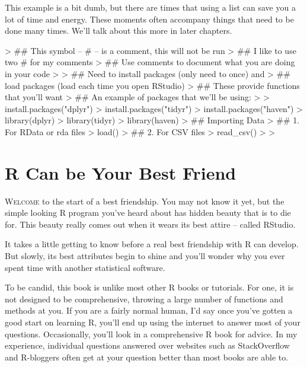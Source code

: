 \documentclass{book}
\begin{document}
This example is a bit dumb, but there are times that using a list can save you a lot of time and energy. These moments often accompany things that need to be done many times. We'll talk about this more in later chapters.




\begin{Schunk}
\begin{Sinput}
> ## This symbol -- # -- is a comment, this will not be run
> ## I like to use two # for my comments
> ## Use comments to document what you are doing in your code
> 
> ## Need to install packages (only need to once) and 
> ##   load packages (load each time you open RStudio)
> ## These provide functions that you'll want
> ## An example of packages that we'll be using:
> 
> install.packages("dplyr")
> install.packages("tidyr")
> install.packages("haven")
> library(dplyr)
> library(tidyr)
> library(haven)
> ## Importing Data
> ##   1. For RData or rda files
> load()
> ##   2. For CSV files
> read_csv()
> 
> 
\end{Sinput}
\end{Schunk}






\chapter{R Can be Your Best Friend}
\label{ch_intro}

\textsc{Welcome} to the start of a best friendship. You may not know it yet, but the simple looking R program you've heard about has hidden beauty that is to die for. This beauty really comes out when it wears its best attire -- called RStudio.

It takes a little getting to know before a real best friendship with R can develop. But slowly, its best attributes begin to shine and you'll wonder why you ever spent time with another statistical software.

To be candid, this book is unlike most other R books or tutorials. For one, it is not designed to be comprehensive, throwing a large number of functions and methods at you. If you are a fairly normal human, I'd say once you've gotten a good start on learning R, you'll end up using the internet to answer most of your questions. Occasionally, you'll look in a comprehensive R book for advice. In my experience, individual questions answered over websites such as StackOverflow and R-bloggers often get at your question better than most books are able to.
\end{document}
